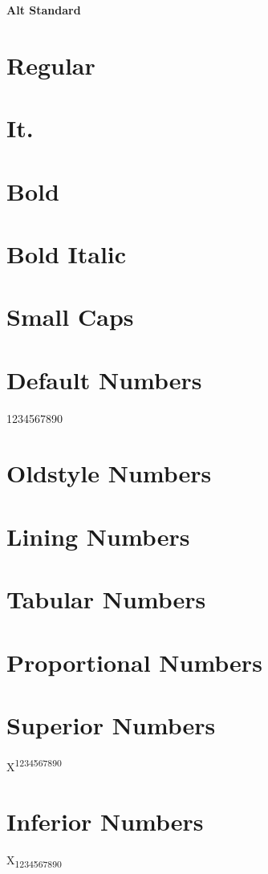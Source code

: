 \documentclass[a4paper]{article}
\begin{document}
\thispagestyle{empty}
\begin{center}\huge\textbf{Alt Standard}
\end{center}
%
\section*{Regular}
\lipsum[1]
%
\section*{It.}
\textit{\lipsum[2]}
%
\section*{Bold}
\textbf{\lipsum[4]}
%
\section*{Bold Italic}
\textbf{\textit{\lipsum[1]}}
%
\section*{Small Caps}
\textsc{\lipsum[1]}
%
\section*{Default Numbers}
1234567890
%
\section*{Oldstyle Numbers}
%
\section*{Lining Numbers}
%
\section*{Tabular Numbers}
%
\section*{Proportional Numbers}
%
\section*{Superior Numbers}
X\textsuperscript{1234567890}
%
\section*{Inferior Numbers}
X\textsubscript{1234567890}
%
\end{document}
